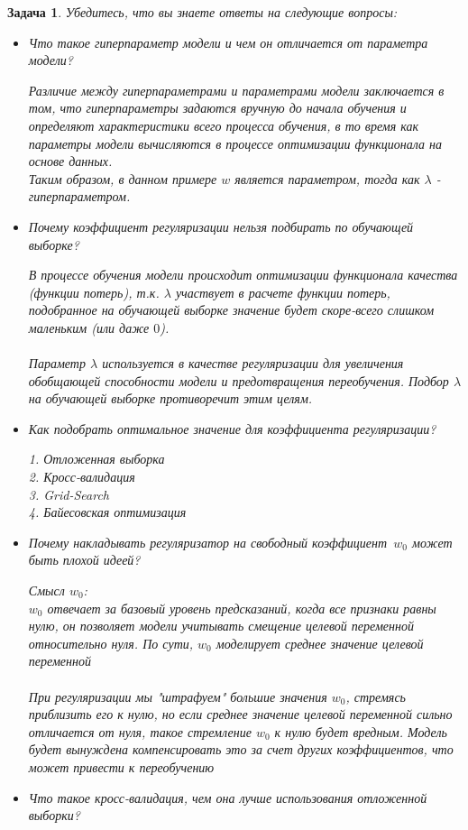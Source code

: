 \documentclass[a4paper,12pt]{article}
\theoremstyle{mystyle}
\newtheorem{esProblem}{Задача}
\begin{document}
\begin{esProblem}
    Убедитесь, что вы знаете ответы на следующие вопросы:
    \begin{itemize}
        \item Что такое гиперпараметр модели и чем он отличается от параметра модели?
        
        Различие между гиперпараметрами и параметрами модели заключается в том, что гиперпараметры задаются вручную до начала обучения и определяют характеристики всего процесса обучения, в то время как параметры модели вычисляются в процессе оптимизации функционала на основе данных. \\
        Таким образом, в данном примере $w$ является параметром, тогда как $\lambda$ - гиперпараметром.
        \item Почему коэффициент регуляризации нельзя подбирать по обучающей выборке?
        
        В процессе обучения модели происходит оптимизации функционала качества (функции потерь), т.к. $\lambda$ участвует в расчете функции потерь, подобранное на обучающей выборке значение будет скоре-всего слишком маленьким (или даже $0$). \\\\
        Параметр $\lambda$ используется в качестве регуляризации для увеличения обобщающей способности модели и предотвращения переобучения. Подбор $\lambda$ на обучающей выборке противоречит этим целям. 
        \item Как подобрать оптимальное значение для коэффициента регуляризации? 
        
        1. Отложенная выборка \\
        2. Кросс-валидация \\
        3. Grid-Search \\
        4. Байесовская оптимизация
        \item Почему накладывать регуляризатор на свободный коэффициент~$w_0$ может быть плохой идеей?
        
        Смысл $w_0$: \\
        $w_0$ отвечает за базовый уровень предсказаний, когда все признаки равны нулю, он позволяет модели учитывать смещение целевой переменной относительно нуля. По сути, $w_0$ моделирует среднее значение целевой переменной \\\\
        При регуляризации мы "штрафуем" большие значения $w_0$, стремясь приблизить его к нулю, но если среднее значение целевой переменной сильно отличается от нуля, такое стремление $w_0$ к нулю будет вредным. Модель будет вынуждена компенсировать это за счет других коэффициентов, что может привести к переобучению
        \item Что такое кросс-валидация, чем она лучше использования отложенной выборки?
        

\end{itemize}
\end{esProblem}
\end{document}
